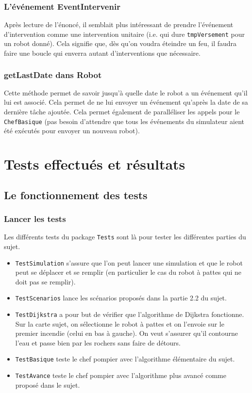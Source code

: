 \documentclass[a4paper,8pt]{article} %
\begin{document}
\subsubsection{L'événement EventIntervenir}
Après lecture de l'énoncé, il semblait plus intéressant de prendre l'événement d'intervention comme une intervention unitaire
(i.e. qui dure \texttt{tmpVersement} pour un robot donné). Cela signifie que, dès qu'on voudra éteindre un feu, il faudra faire une 
boucle qui enverra autant d'interventions que nécessaire.
\subsubsection{getLastDate dans Robot}
Cette méthode permet de savoir jusqu'à quelle date le robot a un événement qu'il lui est associé. Cela permet de ne lui envoyer un événement
qu'après la date de sa dernière tâche ajoutée. Cela permet également de paralléliser les appels pour le \texttt{ChefBasique} 
(pas besoin d'attendre que tous les événements du simulateur aient été exécutés pour envoyer un nouveau robot).

\section{Tests effectués et résultats}
\subsection{Le fonctionnement des tests}
\subsubsection{Lancer les tests}
Les différents tests du package \texttt{Tests} sont là pour tester les différentes parties du sujet.
\begin{itemize}
    \item \texttt{TestSimulation} s'assure que l'on peut lancer une simulation et que le robot peut se déplacer et se remplir
    (en particulier le cas du robot à pattes qui ne doit pas se remplir).
    \item \texttt{TestScenarios} lance les scénarios proposés dans la partie 2.2 du sujet.
    \item \texttt{TestDijkstra} a pour but de vérifier que l'algorithme de Dijkstra fonctionne. Sur la carte sujet, 
    on sélectionne le robot à pattes et on l'envoie sur le premier incendie (celui en bas à gauche).
    On veut s'assurer qu'il contourne l'eau et passe bien par les rochers sans faire de détours.
    \item \texttt{TestBasique} teste le chef pompier avec l'algorithme élémentaire du sujet.
    \item \texttt{TestAvance} teste le chef pompier avec l'algorithme plus avancé comme proposé dans le sujet.
\end{itemize}
\end{document}
